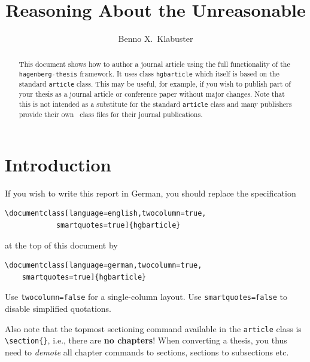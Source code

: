 \documentclass[language=english,twocolumn=true,smartquotes=true]{hgbarticle}
\begin{document}

\author{Benno X.\ Klabuster}
\title{Reasoning About the Unreasonable}
\date{}

\maketitle

\begin{abstract}\noindent
This document shows how to author a journal article using the full functionality
of the \texttt{hagenberg-thesis} framework. It uses class \texttt{hgb\-article} 
which itself is based on the standard \latex \texttt{article} class. This may be 
useful, for example, if you wish to publish part of your thesis as a journal article
or conference paper without major changes.
Note that this is not intended as a substitute for the standard \texttt{article}
class and many publishers provide their own \latex\ class files for their journal
publications.
\end{abstract}


\section{Introduction}

If you wish to write this report in German, you should replace the specification
%
\begin{verbatim}
\documentclass[language=english,twocolumn=true,
            smartquotes=true]{hgbarticle}
\end{verbatim}
%
at the top of this document by
%
\begin{verbatim}
\documentclass[language=german,twocolumn=true,
    smartquotes=true]{hgbarticle}
\end{verbatim}
%
Use \texttt{twocolumn=false} for a single-column layout. Use \texttt{smartquotes=false}
to disable simplified quotations.

Also note that the topmost sectioning command available in the \texttt{article}
class is \verb!\section{}!, i.e., there are \textbf{no chapters}!
When converting a thesis, you thus need to \emph{demote} all chapter commands to
sections, sections to subsections etc.
\end{document}
